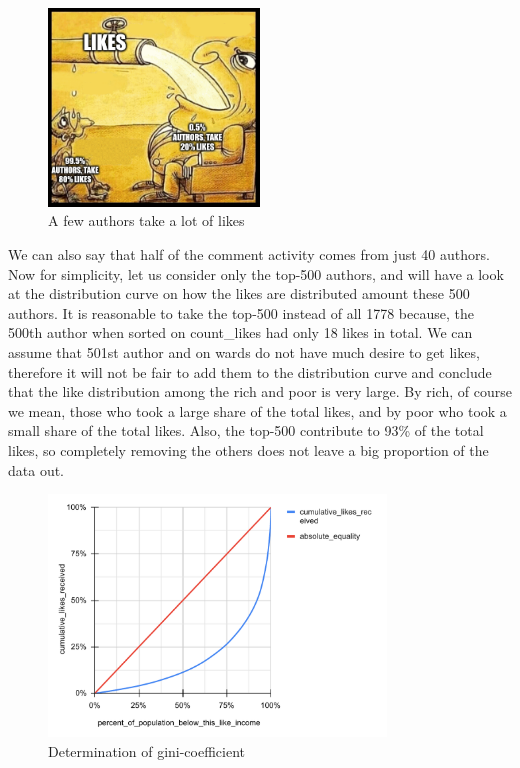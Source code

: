 \documentclass[
	11pt
] {article}
\begin{document}
	\begin{figure}[H]
		\centering
		\includegraphics[width=0.5\textwidth]{fig-small-author-take-almost-all-likes}
		\caption{A few authors take a lot of likes}
		\label{fig-small-author-take-almost-all-likes}
	\end{figure}

	We can also say that half of the comment activity comes from just 40 authors. Now for simplicity, let us consider only the top-500 authors, and will have a look at the distribution curve on how the likes are distributed amount these 500 authors. It is reasonable to take the top-500 instead of all \num{1778} because, the 500th author when sorted on count\_likes had only 18 likes in total. We can assume that 501st author and on wards do not have much desire to get likes, therefore it will not be fair to add them to the distribution curve and conclude that the like distribution among the rich and poor is very large. By rich, of course we mean, those who took a large share of the total likes, and by poor who took a small share of the total likes. Also, the top-500 contribute to \num{93}\% of the total likes, so completely removing the others does not leave a big proportion of the data out.

	\begin{figure}[H]
		\centering
		\includegraphics[width=0.8\textwidth]{fig-gini-calculation}
		\caption{Determination of gini-coefficient \cite{wikipedia-gini}}
		\label{fig-gini-calculation}
	\end{figure}
\end{document}
